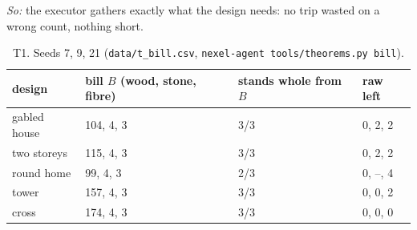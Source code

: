 \emph{So:} the executor gathers exactly what the design needs: no trip wasted on a wrong count, nothing short.

\begin{table}[h]\centering
\begin{tabular}{llll}\toprule
design & bill $B$ (wood, stone, fibre) & stands whole from $B$ & raw left\\\midrule
gabled house & 104, 4, 3 & 3/3 & 0, 2, 2\\
two storeys & 115, 4, 3 & 3/3 & 0, 2, 2\\
round home & 99, 4, 3 & 2/3 & 0, --, 4\\
tower & 157, 4, 3 & 3/3 & 0, 0, 2\\
cross & 174, 4, 3 & 3/3 & 0, 0, 0\\\bottomrule
\end{tabular}\caption{T1. Seeds 7, 9, 21 (\texttt{data/t\_bill.csv}, \texttt{nexel-agent tools/theorems.py bill}).}
\end{table}

